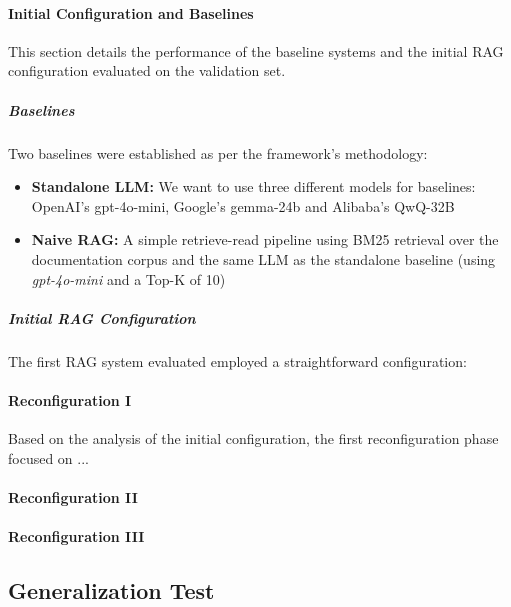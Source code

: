 \paragraph{Initial Configuration and Baselines} \label{sec:exp_initial_config}
This section details the performance of the baseline systems and the initial RAG configuration evaluated on the validation set. 

\subparagraph{Baselines}
Two baselines were established as per the framework's methodology:
\begin{itemize}
    \item \textbf{Standalone LLM:} We want to use three different models for baselines: OpenAI's gpt-4o-mini\cite{OpenAI_2022}, Google's gemma-24b \cite{Gemma3.25.03.2025} and Alibaba's QwQ-32B\cite{qwq32b,qwen2.5}
    \item \textbf{Naive RAG:} A simple retrieve-read pipeline using BM25 retrieval over the documentation corpus and the same LLM as the standalone baseline (using \textit{gpt-4o-mini} and a Top-K of 10)
\end{itemize}


\subparagraph{Initial RAG Configuration} %
The first RAG system evaluated employed a straightforward configuration:


\paragraph{Reconfiguration I} \label{sec:exp_reconfig_1}
Based on the analysis of the initial configuration, the first reconfiguration phase focused on ...


\paragraph{Reconfiguration II} \label{sec:exp_reconfig_2}


\paragraph{Reconfiguration III} \label{sec:exp_reconfig_3}

\subsection{Generalization Test} \label{sec:exp_generalization}

